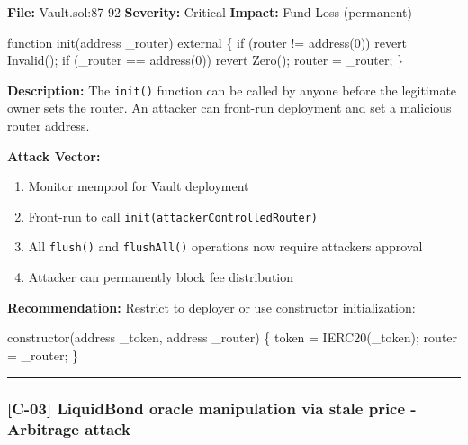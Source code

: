\documentclass[
]{article}
\newenvironment{Shaded}{}{}
\newcommand{\NormalTok}[1]{#1}
\providecommand{\tightlist}{%
  \setlength{\itemsep}{0pt}\setlength{\parskip}{0pt}}
\begin{document}
\textbf{File:} Vault.sol:87-92 \textbf{Severity:} Critical
\textbf{Impact:} Fund Loss (permanent)

\begin{Shaded}
\begin{Highlighting}[]
\NormalTok{function init(address \_router) external \{}
\NormalTok{    if (router != address(0)) revert Invalid();}
\NormalTok{    if (\_router == address(0)) revert Zero();}
\NormalTok{    router = \_router;}
\NormalTok{\}}
\end{Highlighting}
\end{Shaded}

\textbf{Description:} The \texttt{init()} function can be called by
anyone before the legitimate owner sets the router. An attacker can
front-run deployment and set a malicious router address.

\textbf{Attack Vector:}

\begin{enumerate}
\def\labelenumi{\arabic{enumi}.}
\tightlist
\item
  Monitor mempool for Vault deployment
\item
  Front-run to call \texttt{init(attackerControlledRouter)}
\item
  All \texttt{flush()} and \texttt{flushAll()} operations now require
  attacker\textquotesingle s approval
\item
  Attacker can permanently block fee distribution
\end{enumerate}

\textbf{Recommendation:} Restrict to deployer or use constructor
initialization:

\begin{Shaded}
\begin{Highlighting}[]
\NormalTok{constructor(address \_token, address \_router) \{}
\NormalTok{    token = IERC20(\_token);}
\NormalTok{    router = \_router;}
\NormalTok{\}}
\end{Highlighting}
\end{Shaded}

\begin{center}\rule{0.5\linewidth}{0.5pt}\end{center}

\subsubsection{{[}C-03{]} LiquidBond oracle manipulation via stale price
- Arbitrage
attack}\label{c-03-liquidbond-oracle-manipulation-via-stale-price---arbitrage-attack}
\end{document}
